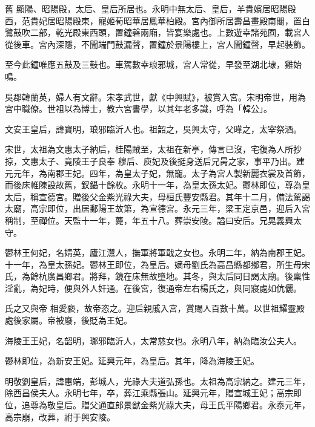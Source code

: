 \begin{pinyinscope}
 舊
 顯陽、昭陽殿，太后、皇后所居也。永明中無太后、皇后，羊貴嬪居昭陽殿西，范貴妃居昭陽殿東，寵姬荀昭華居鳳華柏殿。宮內御所居壽昌畫殿南閣，置白鷺鼓吹二部，乾光殿東西頭，置鐘磬兩廂，皆宴樂處也。上數遊幸諸苑囿，載宮人從後車。宮內深隱，不聞端門鼓漏聲，置鐘於景陽樓上，宮人聞鐘聲，早起裝飾。



 至今此鐘唯應五鼓及三鼓也。車駕數幸琅邪城，宮人常從，早發至湖北埭，雞始鳴。



 吳郡韓蘭英，婦人有文辭。宋孝武世，獻《中興賦》，被賞入宮。宋明帝世，用為宮中職僚。世祖以為博士，教六宮書學，以其年老多識，呼為「韓公」。



 文安王皇后，諱寶明，琅邪臨沂人也。祖韶之，吳興太守，父曄之，太宰祭酒。



 宋世，太祖為文惠太子納后，桂陽賊至，太祖在新亭，傳言已沒，宅復為人所抄掠，文惠太子、竟陵王子良奉
 穆后、庾妃及後挺身送后兄昺之家，事平乃出。建元元年，為南郡王妃。四年，為皇太子妃，無寵。太子為宮人製新麗衣裳及首飾，而後床帷陳設故舊，釵鑷十餘枚。永明十一年，為皇太孫太妃。鬱林即位，尊為皇太后，稱宣德宮。贈後父金紫光祿大夫，母桓氏豐安縣君。其年十二月，備法駕謁太廟，高宗即位，出居鄱陽王故第，為宣德宮。永元三年，梁王定京邑，迎后入宮稱制，至禪位。天監十一年，薨，年五十八。葬崇安陵。謚曰安后。兄晃義興太守。



 鬱林王何妃，名婧英，廬江灊人，撫軍將軍戢之女也。永明二年，納為南郡王妃。十一年，為皇太孫妃。鬱林王即位，為皇后。嫡母劉氏為高昌縣都鄉君，所生母宋氏，為餘杭廣昌鄉君。將拜，鏡在床無故墮地。其冬，與太后同日謁太廟。後稟性淫亂，為妃時，便與外人奸通。在後宮，復通帝左右楊氏之，與同寢處如伉儷。



 氏之又與帝
 相愛褻，故帝恣之。迎后親戚入宮，賞賜人百數十萬。以世祖耀靈殿處後家屬。帝被廢，後貶為王妃。



 海陵王王妃，名韶明，瑯邪臨沂人，太常慈女也。永明八年，納為臨汝公夫人。



 鬱林即位，為新安王妃。延興元年，為皇后。其年，降為海陵王妃。



 明敬劉皇后，諱惠端，彭城人，光祿大夫道弘孫也。太祖為高宗納之。建元三年，除西昌侯夫人。永明七年，卒，葬江乘縣張山。延興元年，贈宣城王妃；高宗即位，追尊為敬皇后。贈父通直郎景猷金紫光祿大夫，母王氏平陽鄉君。永泰元年，高宗崩，改葬，祔于興安陵。




\end{pinyinscope}
